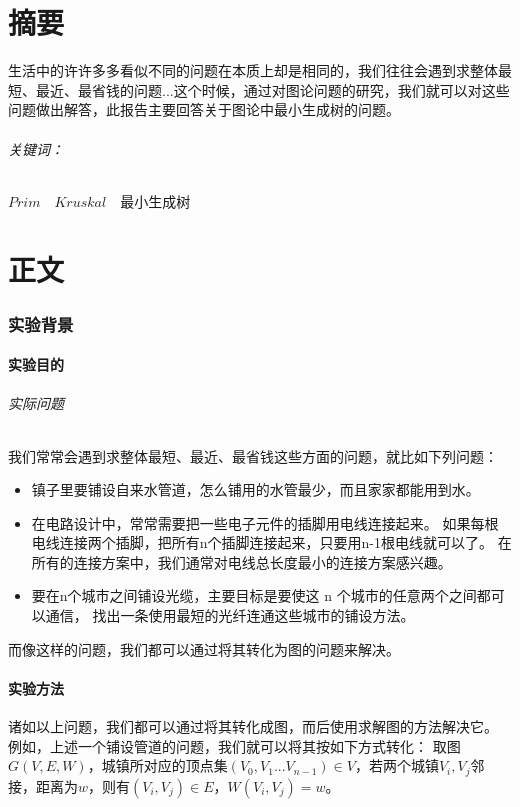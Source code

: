 \documentclass[a4paper,10pt]{ctexart}
\begin{document}
\part*{摘要}
生活中的许许多多看似不同的问题在本质上却是相同的，我们往往会遇到求整体最短、最近、最省钱的问题...这个时候，通过对图论问题的研究，我们就可以对这些问题做出解答，此报告主要回答关于图论中最小生成树的问题。
\paragraph{关键词：}$Prim$\ \ $Kruskal$\ \ 最小生成树
\tableofcontents

\newpage
\part{正文}
\section{实验背景}

\subsection{实验目的}
\paragraph{实际问题} 我们常常会遇到求整体最短、最近、最省钱这些方面的问题，就比如下列问题：
\begin{itemize}
\item 镇子里要铺设自来水管道，怎么铺用的水管最少，而且家家都能用到水。
\item 在电路设计中，常常需要把一些电子元件的插脚用电线连接起来。 如果每根电线连接两个插脚，把所有n个插脚连接起来，只要用n-1根电线就可以了。 在所有的连接方案中，我们通常对电线总长度最小的连接方案感兴趣。
\item 要在n个城市之间铺设光缆，主要目标是要使这 n 个城市的任意两个之间都可以通信， 找出一条使用最短的光纤连通这些城市的铺设方法。
\end{itemize}
而像这样的问题，我们都可以通过将其转化为图的问题来解决。

\subsection{实验方法}
诸如以上问题，我们都可以通过将其转化成图，而后使用求解图的方法解决它。
例如，上述一个铺设管道的问题，我们就可以将其按如下方式转化：
取图$G(V,E,W)$，城镇所对应的顶点集$(V_0,V_1...V_{n-1}) \in V $，若两个城镇$V_i,V_j$邻接，距离为$w$，则有$(V_i,V_j)\in E$，$W(V_i,V_j)=w$。
\end{document}

